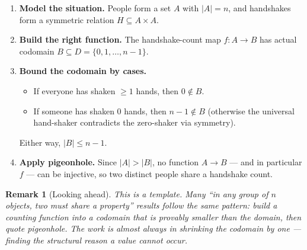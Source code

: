 \documentclass[11pt]{article}
\theoremstyle{defstyle}
\theoremstyle{thmstyle}
\theoremstyle{notstyle}
\newtheorem*{remark}{Remark}
\theoremstyle{cautionstyle}
\begin{document}
\begin{enumerate}[leftmargin=2em]
  \item \textbf{Model the situation.} People form a set $A$ with $|A| = n$,
    and handshakes form a symmetric relation $H \subseteq A \times A$.
  \item \textbf{Build the right function.} The handshake-count map
    $f \colon A \to B$ has actual codomain $B \subseteq D = \{0, 1, \ldots, n-1\}$.
  \item \textbf{Bound the codomain by cases.}
    \begin{itemize}[leftmargin=1.5em, itemsep=2pt]
      \item If everyone has shaken $\geq 1$ hands, then $0 \notin B$.
      \item If someone has shaken $0$ hands, then $n - 1 \notin B$
        (otherwise the universal hand-shaker contradicts the zero-shaker
        via symmetry).
    \end{itemize}
    Either way, $|B| \leq n - 1$.
  \item \textbf{Apply pigeonhole.} Since $|A| > |B|$, no function
    $A \to B$ --- and in particular $f$ --- can be injective, so two
    distinct people share a handshake count.
\end{enumerate}

\begin{notebox}
\begin{remark}[Looking ahead]
This is a template. Many ``in any group of $n$ objects, two must share
a property'' results follow the same pattern: build a counting function
into a codomain that is provably smaller than the domain, then quote
pigeonhole. The work is almost always in shrinking the codomain by one
--- finding the structural reason a value cannot occur.
\end{remark}
\end{notebox}
\end{document}
